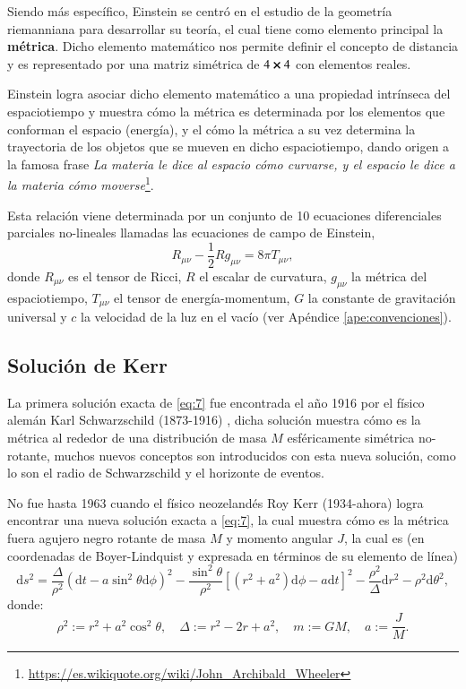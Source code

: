 Siendo más específico, Einstein se centró en el estudio de la geometría riemanniana para desarrollar su teoría, el cual tiene como elemento principal la \textbf{métrica}. Dicho elemento matemático nos permite definir el concepto de distancia y es representado por una matriz simétrica de $4 \cross 4$ con elementos reales.

Einstein logra asociar dicho elemento matemático a una propiedad intrínseca del espaciotiempo y muestra cómo la métrica es determinada por los elementos que conforman el espacio (energía), y el cómo la métrica a su vez determina la trayectoria de los objetos que se mueven en dicho espaciotiempo, dando origen a la famosa frase \textit{La materia le dice al espacio cómo curvarse, y el espacio le dice a la materia cómo moverse}\footnote{\url{https://es.wikiquote.org/wiki/John_Archibald_Wheeler}}.

Esta relación viene determinada por un conjunto de 10 ecuaciones diferenciales parciales no-lineales llamadas las ecuaciones de campo de Einstein,
\begin{equation}
\label{eq:7}
R_{\mu \nu} - \frac{1}{2}R g_{\mu \nu} = 8\pi  T_{\mu \nu},
\end{equation}
donde $R_{\mu \nu}$ es el tensor de Ricci, $R$ el escalar de curvatura, $g_{\mu \nu}$ la métrica del espaciotiempo, $T_{\mu \nu}$ el tensor de energía-momentum, $G$ la constante de gravitación universal y $c$ la velocidad de la luz en el vacío (ver Apéndice \ref{ape:convenciones}).

\subsection{Solución de Kerr}

La primera solución exacta de \eqref{eq:7} fue encontrada el año 1916 por el físico alemán Karl Schwarzschild (1873-1916) \cite{Heinicke}, dicha solución muestra cómo es la métrica al rededor de una distribución de masa $M$ esféricamente simétrica no-rotante, muchos nuevos conceptos son introducidos con esta nueva solución, como lo son el radio de Schwarzschild y el horizonte de eventos.

No fue hasta 1963 cuando el físico neozelandés Roy Kerr (1934-ahora) \cite{Heinicke} logra encontrar una nueva solución exacta a \eqref{eq:7}, la cual muestra cómo es la métrica fuera agujero negro rotante de masa $M$ y momento angular $J$, la cual es (en coordenadas de Boyer-Lindquist y expresada en términos de su elemento de línea)
\begin{equation}
\label{eq:8}
\mathrm{d}s^2 = \frac{\Delta}{\rho^2} \left( \mathrm{d}t - a \sin^2 \theta \mathrm{d}\phi \right)^2 - \frac{\sin^2 \theta}{\rho^2} \left[ (r^2 + a^2)\mathrm{d}\phi - a\mathrm{d}t \right]^2 - \frac{\rho^2}{\Delta} \mathrm{d}r^2 - \rho^2 \mathrm{d}\theta^2,
\end{equation}
donde: 
\begin{equation}
\rho^2 := r^2 + a^2 \cos^2 \theta ,\quad \Delta := r^2 - 2r + a^2, \quad m := GM, \quad a := \frac{J}{M}.
\end{equation}

